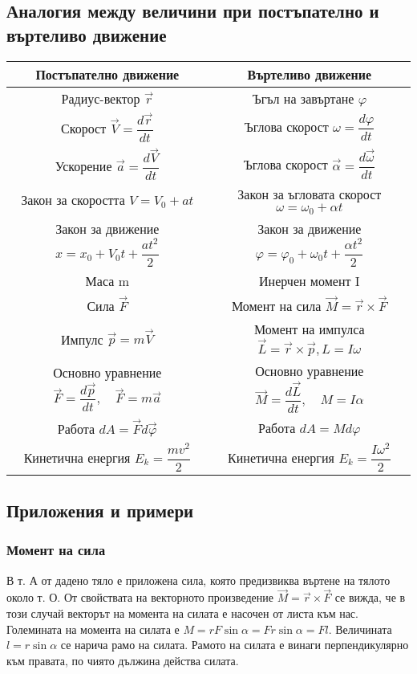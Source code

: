 \documentclass[fleqn]{article}
\begin{document}
\subsection{Аналогия между величини при постъпателно и въртеливо движение}

\begin{center}
\begin{tabular}{ |c|c| } 
 \hline
 \textbf{Постъпателно движение} & \textbf{Въртеливо движение} \\ 
\hline
Радиус-вектор $\vec{r} $ & Ъгъл на завъртане $\varphi$ \\ 
\hline
 Скорост $\vec{V} = \dfrac{d \vec{r}}{dt}$ & Ъглова скорост  $\omega = \dfrac{d\varphi}{dt}$\\ 
 \hline
 Ускорение $\vec{a} = \dfrac{d \vec{V}}{dt}$ & Ъглова скорост  $\vec{\alpha} = \dfrac{d\vec{\omega}}{dt}$\\ 
 \hline
 Закон за скоростта $V = V_0 + at$ & Закон за ъгловата скорост $\omega = \omega_0 + \alpha t$ \\
\hline
Закон за движение $x = x_0 + V_0t + \dfrac{at^2}{2}$ & Закон за движение  $\varphi = \varphi_0 + \omega_0t + \dfrac{\alpha t^2}{2}$  \\
\hline
Маса m & Инерчен момент I\\
\hline
Сила $\vec{F}$ & Момент на сила $\vec{M} = \vec{r} \times \vec{F} $ \\
\hline
Импулс $\vec{p} = m\vec{V}$ & Момент на импулса $\vec{L} = \vec{r} \times \vec{p}, L = I\omega $\\
\hline
Основно уравнение $ \vec{F} = \dfrac{d \vec{p}}{dt}, \quad  \vec{F} = m\vec{a} $ & Основно уравнение $\vec{M} = \dfrac{d \vec{L}}{dt}, \quad  M = I\alpha$ \\
\hline
Работа $dA = \vec{F} d\vec{\varphi}$ & Работа $dA = Md\varphi$ \\
\hline
Кинетична енергия $E_k = \dfrac{mv^2}{2}$ &  Кинетична енергия $E_k = \dfrac{I \omega^2}{2}$\\
\hline
\end{tabular}
\end{center}

\subsection{Приложения и примери}

\subsubsection{Момент на сила}
В т. А от дадено тяло е приложена сила, която предизвиква въртене на тялото около т. О. От свойствата на векторното произведение $\vec{M} = \vec{r} \times \vec{F}$ се вижда, че в този случай векторът на момента на силата е насочен от листа към нас. Големината на момента на силата е $M = rF\sin{\alpha} = Fr\sin{\alpha} = Fl$. Величината $l = r\sin{\alpha}$ се нарича рамо на силата. Рамото на силата е винаги перпендикулярно към правата, по чиято дължина действа силата.
\end{document}
